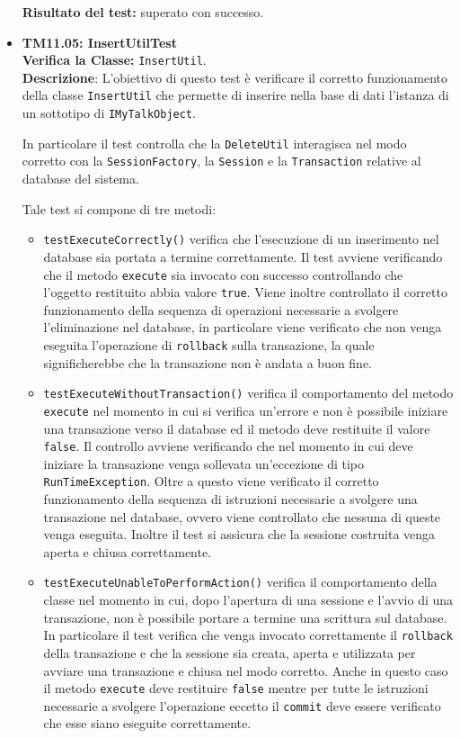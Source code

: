 \begin{itemize}
\begin{itemize}
\end{itemize}
\textbf{Risultato del test:} superato con successo.

\item \textbf{TM11.05: InsertUtilTest}\\
\textbf{Verifica la Classe:} \texttt{InsertUtil}.\\
\textbf{Descrizione}: L'obiettivo di questo test è verificare il corretto funzionamento della classe \texttt{InsertUtil} che permette di inserire nella base di dati l'istanza di un sottotipo di \texttt{IMyTalkObject}.

In particolare il test controlla che la \texttt{DeleteUtil} interagisca nel modo corretto con la \texttt{SessionFactory}, la \texttt{Session} e la \texttt{Transaction} relative al database del sistema.

Tale test si compone di tre metodi:
\begin{itemize}
\item \texttt{testExecuteCorrectly()} 
verifica che l'esecuzione di un inserimento nel database sia portata a termine correttamente. Il test avviene verificando che il metodo \texttt{execute} sia invocato con successo controllando che l'oggetto restituito abbia valore \texttt{true}. Viene inoltre controllato il corretto funzionamento della sequenza di operazioni necessarie a svolgere l'eliminazione nel database, in particolare viene verificato che non venga eseguita l'operazione di \texttt{rollback} sulla transazione, la quale significherebbe che la transazione non è andata a buon fine.

\item \texttt{testExecuteWithoutTransaction()}  verifica il comportamento del metodo \\ \texttt{execute} nel momento in cui si verifica un'errore e non è possibile iniziare una transazione verso il database ed il metodo deve restituite il valore \texttt{false}. Il controllo avviene verificando che nel momento in cui deve iniziare la transazione venga sollevata un'eccezione di tipo \texttt{RunTimeException}. Oltre a questo viene verificato il corretto funzionamento della sequenza di istruzioni necessarie a svolgere una transazione nel database, ovvero viene controllato che nessuna di queste venga eseguita. Inoltre il test si assicura che la sessione costruita venga aperta e chiusa correttamente.

\item \texttt{testExecuteUnableToPerformAction()} verifica il comportamento della classe nel momento in cui, dopo l'apertura di una sessione e l'avvio di una transazione, non è possibile portare a termine una scrittura sul database. In particolare il test verifica che venga invocato correttamente il \texttt{rollback} della transazione e che la sessione sia creata, aperta e utilizzata per avviare una transazione e chiusa nel modo corretto. Anche in questo caso il metodo \texttt{execute} deve restituire \texttt{false} mentre per tutte le istruzioni necessarie a svolgere l'operazione eccetto il \texttt{commit} deve essere verificato che esse siano eseguite correttamente.


\end{itemize}
\end{itemize}
